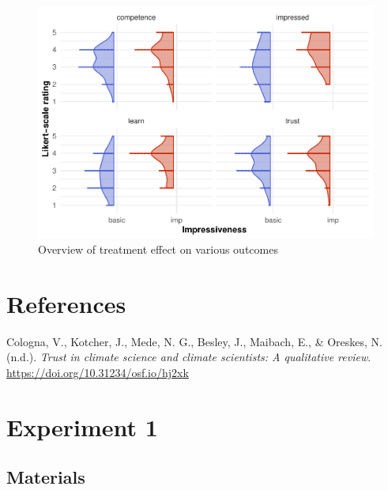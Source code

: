 \documentclass[
  doc,floatsintext]{apa6}
\newlength{\cslhangindent}
\newlength{\cslentryspacingunit} %
\newenvironment{CSLReferences}[2] %
 {%
  \setlength{\parindent}{0pt}
  \ifodd #1
  \let\oldpar\par
  \def\par{\hangindent=\cslhangindent\oldpar}
  \fi
  \setlength{\parskip}{#2\cslentryspacingunit}
 }%
 {}
\begin{document}
\begin{figure}
\centering
\includegraphics{output/figures/exp2-plot.pdf}
\caption{\label{fig:exp2-plot}Overview of treatment effect on various outcomes}
\end{figure}

\FloatBarrier

\hypertarget{references}{%
\section{References}\label{references}}

\hypertarget{refs}{}
\begin{CSLReferences}{1}{0}
\leavevmode{}%
Cologna, V., Kotcher, J., Mede, N. G., Besley, J., Maibach, E., \& Oreskes, N. (n.d.). \emph{Trust in climate science and climate scientists: A qualitative review}. \url{https://doi.org/10.31234/osf.io/hj2xk}

\end{CSLReferences}

\newpage

\hypertarget{appendix-appendix}{%
\appendix}


\hypertarget{exp1}{%
\section{Experiment 1}\label{exp1}}

\hypertarget{materials-1}{%
\subsection{Materials}\label{materials-1}}
\end{document}
